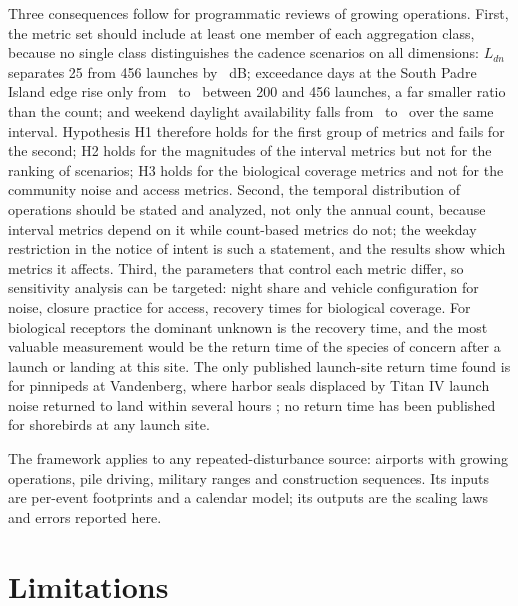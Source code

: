 \documentclass[preprint,12pt,authoryear]{elsarticle}
\begin{document}
Three consequences follow for programmatic reviews of growing operations. First, the metric set should include at least one member of each aggregation class, because no single class distinguishes the cadence scenarios on all dimensions: $L_{dn}$ separates 25 from 456 launches by \valCfTotalTwoFiveFourFiveSixDb~dB; exceedance days at the South Padre Island edge rise only from \valEOneNTwoZeroZeroDaysNineZeroSpi~to \valEOneNFourFiveSixDaysNineZeroSpi~between 200 and 456 launches, a far smaller ratio than the count; and weekend daylight availability falls from \valEOneNTwoZeroZeroWeekendAvail~to \valEOneNFourFiveSixWeekendAvail~over the same interval. Hypothesis H1 therefore holds for the first group of metrics and fails for the second; H2 holds for the magnitudes of the interval metrics but not for the ranking of scenarios; H3 holds for the biological coverage metrics and not for the community noise and access metrics. Second, the temporal distribution of operations should be stated and analyzed, not only the annual count, because interval metrics depend on it while count-based metrics do not; the weekday restriction in the notice of intent is such a statement, and the results show which metrics it affects. Third, the parameters that control each metric differ, so sensitivity analysis can be targeted: night share and vehicle configuration for noise, closure practice for access, recovery times for biological coverage. For biological receptors the dominant unknown is the recovery time, and the most valuable measurement would be the return time of the species of concern after a launch or landing at this site. The only published launch-site return time found is for pinnipeds at Vandenberg, where harbor seals displaced by Titan IV launch noise returned to land within several hours \citep{stewart1993}; no return time has been published for shorebirds at any launch site.

The framework applies to any repeated-disturbance source: airports with growing operations, pile driving, military ranges and construction sequences. Its inputs are per-event footprints and a calendar model; its outputs are the scaling laws and errors reported here.

\section{Limitations}
\end{document}
